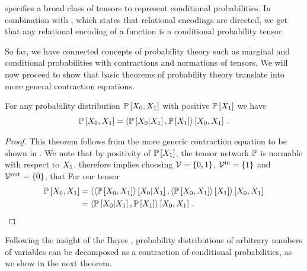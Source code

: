 %
 specifies a broad class of tensors to represent conditional probabilities.
In combination with , which states that relational encodings are directed, we get that any relational encoding of a function is a conditional probability tensor.



So far, we have connected concepts of probability theory such as marginal and conditional probabilities with contractions and normations of tensors.
We will now proceed to show that basic theorems of probability theory translate into more general contraction equations.

\begin{theorem}
    \label{the:bayes}
    For any probability distribution $\mathbb{P}\left[X_{0}, X_{1}\right]$ with positive $\mathbb{P}\left[X_{1}\right]$ we have
    \begin{align*}
        \mathbb{P}\left[X_{0},X_{1}\right]
        = \left\langle \mathbb{P}\left[X_{0}|X_{1}\right],\mathbb{P}\left[X_{1}\right]\right\rangle \left[ X_{0},X_{1} \right] \, .
    \end{align*}
\end{theorem}
\begin{proof}
    This theorem follows from the more generic contraction equation  to be shown in .
    We note that by positivity of $\mathbb{P}\left[X_{1}\right]$, the tensor network $\mathbb{P}$ is normable with respect to $X_{1}$.
     therefore implies choosing $\mathcal{V}=\{0,1\}$, $\mathcal{V}^{\mathrm{in}}=\{1\}$ and $\mathcal{V}^{\mathrm{out}}=\{0\}$, that
    For our tensor
    \begin{align*}
        \mathbb{P}\left[X_{0},X_{1}\right]
        &=\left\langle 
            \left\langle \mathbb{P}\left[X_{0},X_{1}\right]\right\rangle \left[ X_{0} | X_{1} \right],
            \left\langle \mathbb{P}\left[X_{0},X_{1}\right]\right\rangle \left[ X_{1} \right]
        \right\rangle \left[ X_{0},X_{1} \right] \\
        &=\left\langle \mathbb{P}\left[X_{0}|X_{1}\right],\mathbb{P}\left[X_{1}\right]\right\rangle \left[ X_{0},X_{1} \right] \, .
    \end{align*}
\end{proof}

Following the insight of the Bayes , probability distributions of arbitrary numbers of variables can be decomposed as a contraction of conditional probabilities, as we show in the next theorem.

